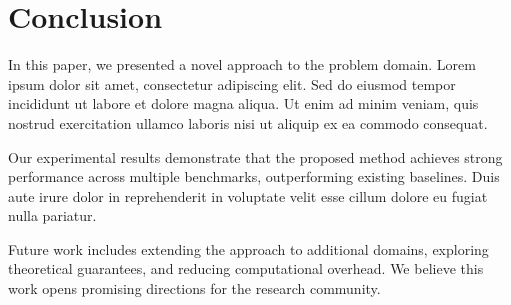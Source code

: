 \section{Conclusion}
\label{sec:conclusion}

In this paper, we presented a novel approach to the problem domain. Lorem ipsum
dolor sit amet, consectetur adipiscing elit. Sed do eiusmod tempor incididunt ut
labore et dolore magna aliqua. Ut enim ad minim veniam, quis nostrud exercitation
ullamco laboris nisi ut aliquip ex ea commodo consequat.

Our experimental results demonstrate that the proposed method achieves strong
performance across multiple benchmarks, outperforming existing baselines. Duis
aute irure dolor in reprehenderit in voluptate velit esse cillum dolore eu fugiat
nulla pariatur.

Future work includes extending the approach to additional domains, exploring
theoretical guarantees, and reducing computational overhead. We believe this work
opens promising directions for the research community.
